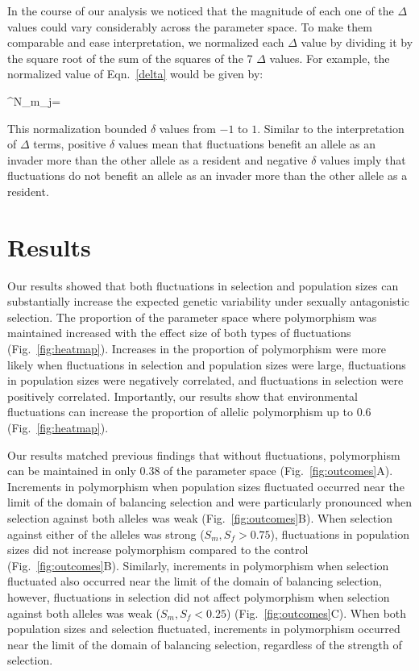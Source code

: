 \documentclass[12pt]{article}
\let\oldequation\equation
\let\oldendequation\endequation
\renewenvironment{equation}
  {\linenomathNonumbers\oldequation}
  {\oldendequation\endlinenomath}
\begin{document}
In the course of our analysis we noticed that the magnitude of each one of the $\Delta$ values could vary considerably across the parameter space. To make them comparable and ease interpretation, we normalized each $\Delta$ value by dividing it by the square root of the sum of the squares of the 7 $\Delta$ values. For example, the normalized value of Eqn.~\ref{delta} would be given by:



\begin{equation}
  \delta^{N_{m}}_{j}= 
\end{equation}

This normalization bounded $\delta$ values from $-1$ to $1$. Similar to the interpretation of $\Delta$ terms, positive $\delta$ values mean that fluctuations benefit an allele as an invader more than the other allele as a resident and negative $\delta$ values imply that fluctuations do not benefit an allele as an invader more than the other allele as a resident.


\section{Results}
Our results showed that both fluctuations in selection and population sizes can substantially increase the expected genetic variability under sexually antagonistic selection. The proportion of the parameter space where polymorphism was maintained increased with the effect size of both types of fluctuations (Fig.~\ref{fig:heatmap}). Increases in the proportion of polymorphism were more likely when fluctuations in selection and population sizes were large, fluctuations in population sizes were negatively correlated, and fluctuations in selection were positively correlated. Importantly, our results show that environmental fluctuations can increase the proportion of allelic polymorphism up to $0.6$ (Fig.~\ref{fig:heatmap}).

Our results matched previous findings that without fluctuations, polymorphism can be maintained in only $ 0.38$ of the parameter space (Fig.~\ref{fig:outcomes}A). Increments in polymorphism when population sizes fluctuated occurred near the limit of the domain of balancing selection and were particularly pronounced when selection against both alleles was weak (Fig.~\ref{fig:outcomes}B). When selection against either of the alleles was strong ($ S_{m}, S_{f}> 0.75 $), fluctuations in population sizes did not increase polymorphism compared to the control (Fig.~\ref{fig:outcomes}B). Similarly, increments in polymorphism when selection fluctuated also occurred near the limit of the domain of balancing selection, however, fluctuations in selection did not affect polymorphism when selection against both alleles was weak ($ S_{m}, S_{f}< 0.25 $) (Fig.~\ref{fig:outcomes}C). When both population sizes and selection fluctuated, increments in polymorphism occurred near the limit of the domain of balancing selection, regardless of the strength of selection.
\end{document}
